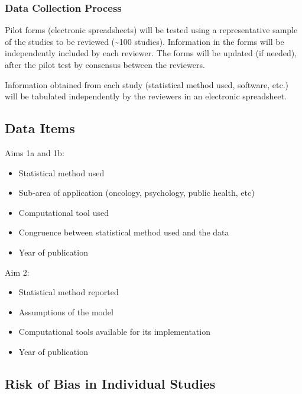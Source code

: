 \documentclass[
]{article}
\begin{document}
\hypertarget{data-collection-process}{%
\subsubsection{Data Collection Process}\label{data-collection-process}}

Pilot forms (electronic spreadsheets) will be tested using a
representative sample of the studies to be reviewed (\textasciitilde100
studies). Information in the forms will be independently included by
each reviewer. The forms will be updated (if needed), after the pilot
test by consensus between the reviewers.

Information obtained from each study (statistical method used, software,
etc.) will be tabulated independently by the reviewers in an electronic
spreadsheet.

\hypertarget{data-items}{%
\subsection{Data Items}\label{data-items}}

Aims 1a and 1b:

\begin{itemize}
\item
  Statistical method used
\item
  Sub-area of application (oncology, psychology, public health, etc)
\item
  Computational tool used
\item
  Congruence between statistical method used and the data
\item
  Year of publication
\end{itemize}

Aim 2:

\begin{itemize}
\item
  Statistical method reported
\item
  Assumptions of the model
\item
  Computational tools available for its implementation
\item
  Year of publication
\end{itemize}

\hypertarget{risk-of-bias-in-individual-studies}{%
\subsection{Risk of Bias in Individual
Studies}\label{risk-of-bias-in-individual-studies}}
\end{document}
